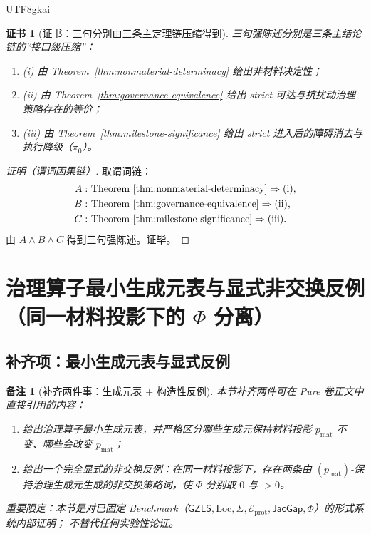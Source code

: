 \documentclass[12pt]{article}
\newtheorem{remark}{备注}[section]
\newtheorem{certificate}{证书}[section]
\newcommand{\GZLS}{\ensuremath{\mathsf{GZLS}}}
\newcommand{\JacGap}{\ensuremath{\mathsf{JacGap}}}
\begin{document}
\begin{CJK*}{UTF8}{gkai}
\begin{certificate}[证书：三句分别由三条主定理链压缩得到]
\label{cert:strong-conclusion}
三句强陈述分别是三条主结论链的“接口级压缩”：
\begin{enumerate}
  \item (i) 由 Theorem~\ref{thm:nonmaterial-determinacy} 给出非材料决定性；
  \item (ii) 由 Theorem~\ref{thm:governance-equivalence} 给出 strict 可达与抗扰动治理策略存在的等价；
  \item (iii) 由 Theorem~\ref{thm:milestone-significance} 给出 strict 进入后的障碍消去与执行降级（$\pi_0$）。
\end{enumerate}
\end{certificate}

\begin{proof}[证明（谓词因果链）]
取谓词链：
\[
\begin{aligned}
A:&\ \text{Theorem~\ref{thm:nonmaterial-determinacy}}\Rightarrow \text{(i)},\\
B:&\ \text{Theorem~\ref{thm:governance-equivalence}}\Rightarrow \text{(ii)},\\
C:&\ \text{Theorem~\ref{thm:milestone-significance}}\Rightarrow \text{(iii)}.
\end{aligned}
\]
由 $A\wedge B\wedge C$ 得到三句强陈述。证毕。
\end{proof}

\clearpage
\section{治理算子最小生成元表与显式非交换反例（同一材料投影下的 $\Phi$ 分离）}
\label{sec:puremath-governance-generators-counterexample}

\subsection{补齐项：最小生成元表与显式反例}

\begin{remark}[补齐两件事：生成元表 + 构造性反例]
本节补齐两件可在 Pure 卷正文中直接引用的内容：
\begin{enumerate}
  \item 给出治理算子最小生成元表，并严格区分哪些生成元保持材料投影 $p_{\mathrm{mat}}$ 不变、哪些会改变 $p_{\mathrm{mat}}$；
  \item 给出一个完全显式的非交换反例：在同一材料投影下，存在两条由 $(p_{\mathrm{mat}})$-保持治理生成元生成的非交换策略词，使 $\Phi$ 分别取 $0$ 与 $>0$。
\end{enumerate}
重要限定：本节是对已固定 Benchmark（$\GZLS,\mathrm{Loc},\Sigma,\mathcal{E}_{\mathrm{prot}},\JacGap,\Phi$）的\emph{形式系统内部}证明；
不替代任何实验性论证。
\end{remark}


\end{CJK*}
\end{document}
